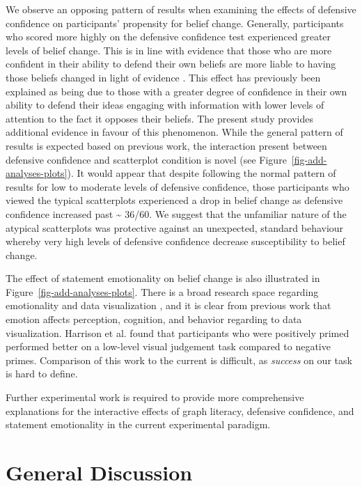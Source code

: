 \documentclass[manuscript,screen,review,anonymous]{acmart}
\begin{document}
We observe an opposing pattern of results when examining the effects of
defensive confidence on participants' propensity for belief change.
Generally, participants who scored more highly on the defensive
confidence test experienced greater levels of belief change. This is in
line with evidence that those who are more confident in their ability to
defend their own beliefs are more liable to having those beliefs changed
in light of evidence \citep{albarracin_2004}. This effect has previously
been explained as being due to those with a greater degree of confidence
in their own ability to defend their ideas engaging with information
with lower levels of attention to the fact it opposes their beliefs. The
present study provides additional evidence in favour of this phenomenon.
While the general pattern of results is expected based on previous work,
the interaction present between defensive confidence and scatterplot
condition is novel (see Figure~\ref{fig-add-analyses-plots}). It would
appear that despite following the normal pattern of results for low to
moderate levels of defensive confidence, those participants who viewed
the typical scatterplots experienced a drop in belief change as
defensive confidence increased past \textasciitilde{} 36/60. We suggest
that the unfamiliar nature of the atypical scatterplots was protective
against an unexpected, standard behaviour whereby very high levels of
defensive confidence decrease susceptibility to belief change.

The effect of statement emotionality on belief change is also
illustrated in Figure~\ref{fig-add-analyses-plots}. There is a broad
research space regarding emotionality and data visualization
\citep{lan_2023}, and it is clear from previous work that emotion
affects perception, cognition, and behavior
\citep{phelps_2006, harrison_2013, thoresen_2016} regarding to data
visualization. Harrison et al. \citep{harrison_2013} found that
participants who were positively primed performed better on a low-level
visual judgement task compared to negative primes. Comparison of this
work to the current is difficult, as \emph{success} on our task is hard
to define.

Further experimental work is required to provide more comprehensive
explanations for the interactive effects of graph literacy, defensive
confidence, and statement emotionality in the current experimental
paradigm.

\section{General Discussion}\label{sec-general-discussion}
\end{document}
